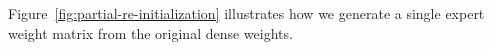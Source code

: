 
Figure~\ref{fig:partial-re-initialization} illustrates how we generate a single expert weight matrix from the original dense weights.



